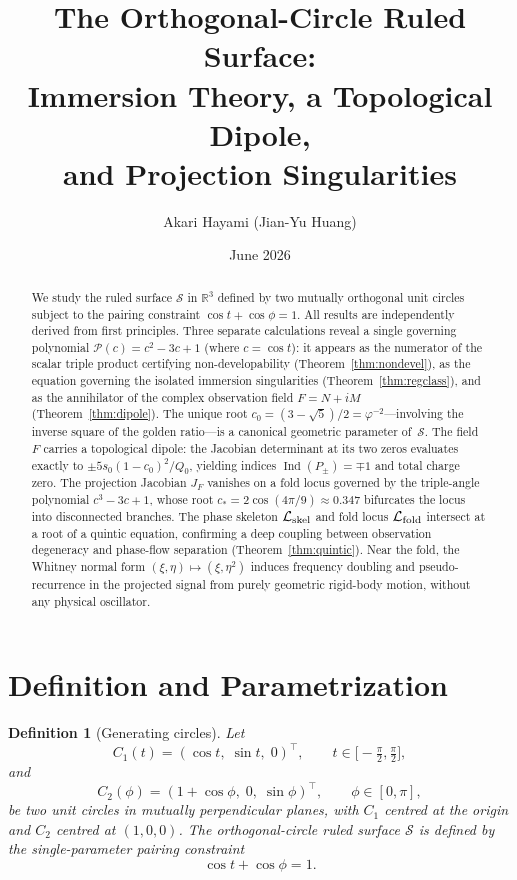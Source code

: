 \documentclass[12pt]{article}
\title{The Orthogonal-Circle Ruled Surface:\\[4pt]
       Immersion Theory, a Topological Dipole,\\
       and Projection Singularities}
\author{Akari Hayami (Jian-Yu Huang)}
\date{June 2026}
\newtheorem{definition}[theorem]{Definition}
\begin{document}
\maketitle

\begin{abstract}
We study the ruled surface $\mathcal{S}$ in $\mathbb{R}^3$ defined by two
mutually orthogonal unit circles subject to the pairing constraint
$\cos t + \cos\phi = 1$.
All results are independently derived from first principles.
Three separate calculations reveal a single governing polynomial
$\mathcal{P}(c) = c^2 - 3c + 1$ (where $c = \cos t$):
it appears as the numerator of the scalar triple product certifying
non-developability (Theorem~\ref{thm:nondevel}),
as the equation governing the isolated immersion singularities
(Theorem~\ref{thm:regclass}),
and as the annihilator of the complex observation field $F = N + iM$
(Theorem~\ref{thm:dipole}).
The unique root $c_0 = (3-\sqrt{5})/2 = \varphi^{-2}$---involving the
inverse square of the golden ratio---is a canonical geometric parameter
of~$\mathcal{S}$.
The field $F$ carries a topological dipole: the Jacobian determinant
at its two zeros evaluates exactly to $\pm 5s_0(1-c_0)^2/Q_0$,
yielding indices $\operatorname{Ind}(P_\pm) = \mp 1$ and total charge zero.
The projection Jacobian $J_F$ vanishes on a fold locus governed by the
triple-angle polynomial $c^3-3c+1$, whose root
$c_* = 2\cos(4\pi/9)\approx 0.347$
bifurcates the locus into disconnected branches.
The phase skeleton $\mathcal{L}_{\rm skel}$ and fold locus
$\mathcal{L}_{\rm fold}$ intersect at a root of a quintic equation,
confirming a deep coupling between observation degeneracy and phase-flow
separation (Theorem~\ref{thm:quintic}).
Near the fold, the Whitney normal form $(\xi,\eta)\mapsto(\xi,\eta^2)$
induces frequency doubling and pseudo-recurrence in the projected signal
from purely geometric rigid-body motion, without any physical oscillator.
\end{abstract}

\tableofcontents\bigskip

\section{Definition and Parametrization}
\label{sec:def}

\begin{definition}[Generating circles]
\label{def:circles}
Let
\[
  C_1(t) = (\cos t,\;\sin t,\;0)^\top, \qquad t\in\bigl[-\tfrac\pi2,\tfrac\pi2\bigr],
\]
and
\[
  C_2(\phi) = (1+\cos\phi,\;0,\;\sin\phi)^\top, \qquad \phi\in[0,\pi],
\]
be two unit circles in mutually perpendicular planes, with $C_1$ centred at
the origin and $C_2$ centred at $(1,0,0)$.
The \emph{orthogonal-circle ruled surface} $\mathcal{S}$ is defined by the
single-parameter \emph{pairing constraint}
\begin{equation}
  \cos t + \cos\phi = 1.
  \label{eq:constraint}
\end{equation}
\end{definition}
\end{document}
